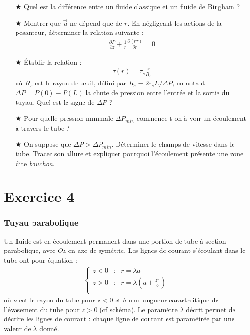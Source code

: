 \documentclass{report}
\begin{document}
\begin{itemize}
	\item[$\bigstar$] Quel est la différence entre un fluide classique et un fluide de Bingham ?

	\item[$\bigstar$] Montrer que $\vec{u}$ ne dépend que de $r$. En négligeant les actions de la pesanteur, déterminer la relation suivante : 
	\begin{align*}
		\frac{\partial P}{\partial z} + \frac{1}{r}\frac{\partial (r\tau)}{\partial r}=0
	\end{align*}
	\item[$\bigstar$] Établir la relation :
	\begin{align*}
		\tau(r) = \tau_s\frac{r}{R_s}
	\end{align*}
	où $R_s$ est le rayon de seuil, défini par $R_s=2\tau_s L/\Delta P$, en notant $\Delta P = P(0)-P(L)$ la chute de pression entre l'entrée et la sortie du tuyau. Quel est le signe de $\Delta P$ ?

	\item[$\bigstar$] Pour quelle pression minimale $\Delta P_{min}$ commence t-on à voir un écoulement à travers le tube ?
	
	\item[$\bigstar$] On suppose que $\Delta P>\Delta P_{min}$. Déterminer le champs de vitesse dans le tube. Tracer son allure et expliquer pourquoi l'écoulement présente une zone dite \textit{bouchon}.
	
	
\end{itemize}

\newpage

\section*{Exercice 4}

\subsubsection*{Tuyau parabolique}

Un fluide est en écoulement permanent dans une portion de tube à section parabolique, avec $Oz$ en axe de symétrie. Les lignes de courant s'écoulant dans le tube ont pour équation :
\begin{align*}
		\left\lbrace
\begin{array}{ccc}
z<0 & : & r=\lambda a \\
z>0 & : & r=\lambda \left(a+\frac{z^2}{b} \right) \\
\end{array}\right.
\end{align*}
où $a$ est le rayon du tube pour $z<0$ et $b$ une longueur caractrsitique de l'évasement du tube pour $z>0$ (cf schéma). Le paramètre $\lambda$ décrit permet de décrire les lignes de courant : chaque ligne de courant est paramétrée par une valeur de $\lambda$ donné.
\end{document}

